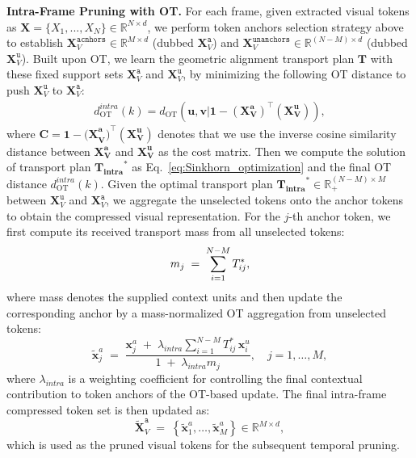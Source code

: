 \noindent \textbf{Intra-Frame Pruning with OT.}
For each frame, given extracted visual tokens as $\bm{X}=\{X_1,...,X_N\} \in \mathbb{R}^{N \times d}$, we perform token anchors selection strategy above to establish $\mathbf{X}_V^{\texttt{acnhors}} \in \mathbb{R}^{M \times d}$ (dubbed $\mathbf{X}_V^{\texttt{a}}$) and $\mathbf{X}_V^{\texttt{unanchors}} \in \mathbb{R}^{(N-M) \times d}$ (dubbed $\mathbf{X}_V^{\texttt{u}}$). Built upon OT, we learn the geometric alignment transport plan $\bm{T}$ with these fixed support sets $\mathbf{X}_V^{\texttt{a}}$ and $\mathbf{X}_V^{\texttt{u}}$, by minimizing the following OT distance to push $\mathbf{X}_V^{\texttt{u}}$ to $\mathbf{X}_V^{\texttt{a}}$:
\begin{equation}
\label{eq:distance}
    \begin{aligned}
         d^{intra}_{\text{OT}}(k) = d_{\text{OT}}(\bm{u},\bm{v}|\bm{1}-\bm{{(X^a_V)}}^\top\bm{({X}^{u}_{V})}),
    \end{aligned}
\end{equation}
where $\bm{C}=\bm{1}-\bm{{(X}^a_V)}^\top\bm{({X}^{u}_{V})}$ denotes that we use the inverse cosine similarity distance between $\bm{X^a_V}$ and $\bm{X^u_V}$ as the cost matrix. Then we compute the solution of transport plan $\bm{T_{intra}}^*$ as Eq.~\ref{eq:Sinkhorn_optimization} and the final OT distance $d^{intra}_{\text{OT}}(k)$. Given the optimal transport plan $\bm{T_{intra}}^* \in \mathbb{R}_+^{(N-M)\times M}$ between
$\mathbf{X}_V^{\texttt{u}}$ and $\mathbf{X}_V^{\texttt{a}}$, we aggregate the unselected tokens onto the anchor tokens to obtain the compressed visual representation.
For the $j$-th anchor token, we first compute its received transport mass from all unselected tokens:
\vspace{-1mm}
\begin{equation}
    m_j \;=\; \sum_{i=1}^{N-M} T^*_{ij},
\vspace{-1mm}
\end{equation}
where mass denotes the supplied context units and then update the corresponding anchor by a mass-normalized OT aggregation from unselected tokens:
\begin{equation}
    \tilde{\mathbf{x}}^{a}_j
    \;=\;
    \frac{
        \mathbf{x}^{a}_j
        \;+\;
        \lambda_{intra} \sum_{i=1}^{N-M} T^*_{ij} \,\mathbf{x}^{u}_i
    }{
        1 \;+\; \lambda_{intra} m_j
    },
    \quad j = 1,\dots,M,
\end{equation}
where $\lambda_{intra}$ is a weighting coefficient for controlling the final contextual contribution to token anchors of the OT-based update. The final intra-frame compressed token set is then updated as:
\begin{equation}
    \tilde{\mathbf{X}}_V^{\texttt{a}}
    \;=\;
    \left\{\tilde{\mathbf{x}}^{a}_1, \dots,
    \tilde{\mathbf{x}}^{a}_M\right\}
    \in \mathbb{R}^{M \times d},
\end{equation}
which is used as the pruned visual tokens for the subsequent temporal pruning.




